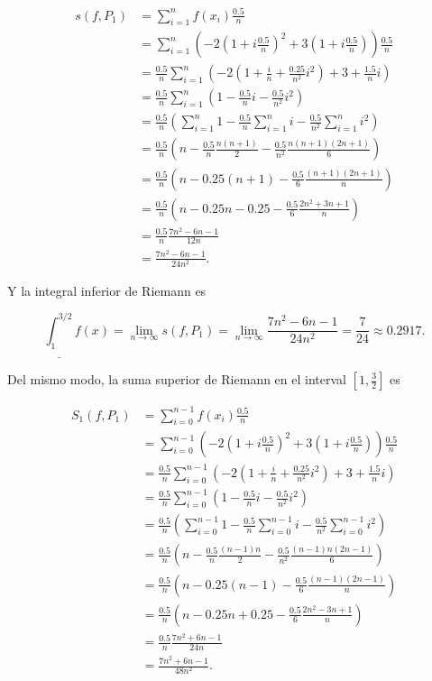 \documentclass[
  spanish,
  a4paper,
]{scrreport}
\theoremstyle{definition}
\theoremstyle{remark}
\begin{document}
\begin{tcolorbox}
\begin{align*}
s(f,P_1) &= \sum_{i=1}^{n} f(x_i)\frac{0.5}{n}\\
&= \sum_{i=1}^{n} \left(- 2\left(1+i\frac{0.5}{n}\right)^2 + 3\left(1+i\frac{0.5}{n}\right)\right)\frac{0.5}{n}\\
&= \frac{0.5}{n} \sum_{i=1}^{n} \left(-2\left(1+\frac{i}{n}+\frac{0.25}{n^2}i^2\right)+3+\frac{1.5}{n}i\right)\\
&= \frac{0.5}{n} \sum_{i=1}^{n} \left(1 - \frac{0.5}{n}i - \frac{0.5}{n^2}i^2\right)\\
&= \frac{0.5}{n} \left(\sum_{i=1}^{n} 1 - \frac{0.5}{n}\sum_{i=1}^{n} i - \frac{0.5}{n^2}\sum_{i=1}^{n} i^2\right)\\
&= \frac{0.5}{n} \left(n - \frac{0.5}{n}\frac{n(n+1)}{2} - \frac{0.5}{n^2}\frac{n(n+1)(2n+1)}{6}\right)\\
&= \frac{0.5}{n} \left(n - 0.25 (n+1) - \frac{0.5}{6}\frac{(n+1)(2n+1)}{n}\right)\\
&= \frac{0.5}{n} \left(n - 0.25 n - 0.25 - \frac{0.5}{6}\frac{2n^2+3n+1}{n}\right)\\
&= \frac{0.5}{n} \frac{7n^2-6n-1}{12n}\\
&= \frac{7n^2-6n-1}{24n^2}.
\end{align*}

Y la integral inferior de Riemann es

\[
\underline{\int_1^{3/2}} f(x)  = \lim_{n \to \infty} s(f,P_1) = \lim_{n \to \infty} \frac{7n^2-6n-1}{24n^2} = \frac{7}{24} \approx
0.2917.
\]

Del mismo modo, la suma superior de Riemann en el interval
\([1, \frac{3}{2}]\) es

\begin{align*}
S_1(f,P_1) &= \sum_{i=0}^{n-1} f(x_i)\frac{0.5}{n}\\
&= \sum_{i=0}^{n-1} \left(- 2\left(1+i\frac{0.5}{n}\right)^2 + 3\left(1+i\frac{0.5}{n}\right)\right)\frac{0.5}{n}\\
&= \frac{0.5}{n} \sum_{i=0}^{n-1} \left(-2\left(1+\frac{i}{n}+\frac{0.25}{n^2}i^2\right)+3+\frac{1.5}{n}i\right)\\
&= \frac{0.5}{n} \sum_{i=0}^{n-1} \left(1 - \frac{0.5}{n}i - \frac{0.5}{n^2}i^2\right)\\
&= \frac{0.5}{n} \left(\sum_{i=0}^{n-1} 1 - \frac{0.5}{n}\sum_{i=0}^{n-1} i - \frac{0.5}{n^2}\sum_{i=0}^{n-1} i^2\right)\\
&= \frac{0.5}{n} \left(n - \frac{0.5}{n}\frac{(n-1)n}{2} - \frac{0.5}{n^2}\frac{(n-1)n(2n-1)}{6}\right)\\
&= \frac{0.5}{n} \left(n - 0.25 (n-1) - \frac{0.5}{6}\frac{(n-1)(2n-1)}{n}\right)\\
&= \frac{0.5}{n} \left(n - 0.25 n + 0.25 - \frac{0.5}{6}\frac{2n^2-3n+1}{n}\right)\\
&= \frac{0.5}{n} \frac{7n^2+6n-1}{24n}\\
&= \frac{7n^2+6n-1}{48n^2}.
\end{align*}


\end{tcolorbox}
\end{document}

